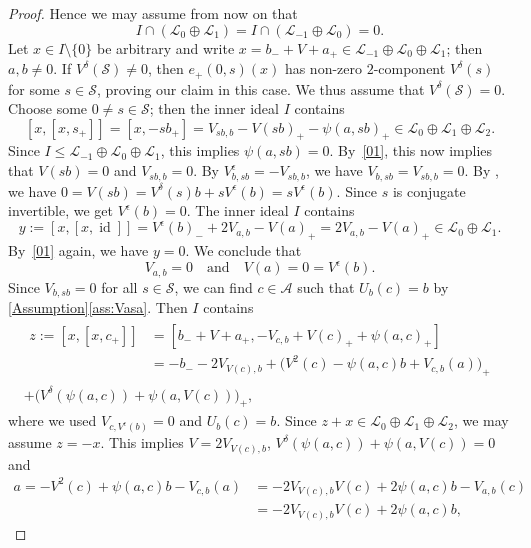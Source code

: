 \documentclass[oneside,a4paper]{amsart} %
\theoremstyle{definition}
\DeclareMathOperator{\id}{id}
\newcommand{\A}{\mathcal{A}}
\renewcommand{\SS}{\mathcal{S}}
\newcommand{\LL}{\mathcal{L}}
\numberwithin{equation}{section}
\begin{document}
\begin{proof}
	Hence we may assume from now on that
	\begin{equation}\label{01}
	    I \cap (\LL_0 \oplus \LL_1) = I \cap (\LL_{-1} \oplus \LL_0) = 0.
	\end{equation}
	Let $x \in I \setminus \{ 0 \}$ be arbitrary and write $x = b_- + V + a_+ \in \LL_{-1} \oplus \LL_0 \oplus \LL_1$; then $a,b\neq 0$. 
	If $V^\delta(\SS)\neq 0$, then $e_+(0,s)(x)$ has non-zero $2$-component $V^\delta (s)$ for some $s\in\SS$, proving our claim in this case. 
	We thus assume that $V^\delta(\SS) = 0$.
	Choose some $0 \neq s \in \SS$; then the inner ideal $I$ contains
	\[ [x,[x,s_+]] = [x,-sb_+] = V_{sb,b} - V(sb)_+ - \psi(a,sb)_+ \in \LL_0 \oplus \LL_1 \oplus \LL_2 . \]
	Since $I \leq \LL_{-1} \oplus \LL_0 \oplus \LL_1$, this implies $\psi(a,sb) = 0$.
	By~\eqref{01}, this now implies that $V(sb)=0$ and $V_{sb,b}=0$.
	By $V_{b, sb}^\epsilon = - V_{sb, b}$, we have $V_{b,sb}=V_{sb,b}=0$.
	By \cite[(5)]{Allison1979}, we have $0=V(sb)=V^\delta(s)b+sV^\epsilon (b)=sV^\epsilon (b)$.
	Since $s$ is conjugate invertible, we get $V^\epsilon(b)=0$.
	The inner ideal $I$ contains
	\[ y:=[x,[x,\id]] = V^\epsilon(b)_- + 2V_{a,b} -V(a)_+ = 2V_{a,b} - V(a)_+ \in \LL_0 \oplus \LL_1 . \]
	By~\eqref{01} again, we have $y=0$. We conclude that
	\begin{equation}\label{Vab}
        V_{a,b}=0 \quad \text{and} \quad V(a)=0=V^\epsilon(b) .
	\end{equation}
	Since $V_{b,sb}=0$ for all $s\in\SS$, we can find $c\in \A$ such that $U_b(c)=b$ by \cref{Assumption}\cref{ass:Vasa}. Then $I$ contains 
	\begin{multline*}
    	\begin{aligned}
            z := [x,[x,c_+]] &= [b_- + V + a_+, -V_{c,b} + V(c)_+ + \psi(a,c)_+] \\
            &= -b_- - 2V_{V(c),b} + \bigl( V^2(c)-\psi(a,c)b+V_{c,b}(a) \bigr)_+
    	\end{aligned} \\
		+ \bigl( V^\delta(\psi(a,c)) + \psi(a,V(c)) \bigr)_+ ,
	 \end{multline*}
	 where we used $V_{c,V^\epsilon(b)}=0$ and $U_b(c)=b$. 
	 Since $z+x \in \LL_0 \oplus \LL_1 \oplus \LL_2$, we may assume $z=-x$.
	 This implies $V=2V_{V(c),b}$, $V^\delta(\psi(a,c))+\psi(a,V(c))=0$ and 
	 \begin{align*}
	 	a = -V^2(c)+\psi(a,c)b-V_{c,b}(a) &= -2V_{V(c),b}V(c)+2\psi(a,c)b-V_{a,b}(c) \\
	 	&= -2V_{V(c),b}V(c)+2\psi(a,c)b,
	 \end{align*} 

\end{proof}
\end{document}
